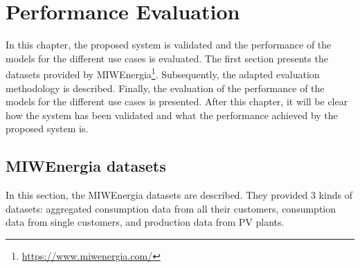 \chapter{Performance Evaluation}
\label{cha:evaluation}
\vspace{0.4 cm}

In this chapter, the proposed system is validated and the performance of the models for the different use cases is evaluated.
The first section presents the datasets provided by MIWEnergia\footnote{ \url{https://www.miwenergia.com/} }.
Subsequently, the adapted evaluation methodology is described.
Finally, the evaluation of the performance of the models for the different use cases is presented.
After this chapter, it will be clear how the system has been validated and what the performance achieved by the proposed system is.


\section{MIWEnergia datasets}
\label{sec:datasets}
\vspace{0.2 cm}

In this section, the MIWEnergia datasets are described.
They provided 3 kinds of datasets: aggregated consumption data from all their customers, consumption data from single customers, and production data from PV plants.

